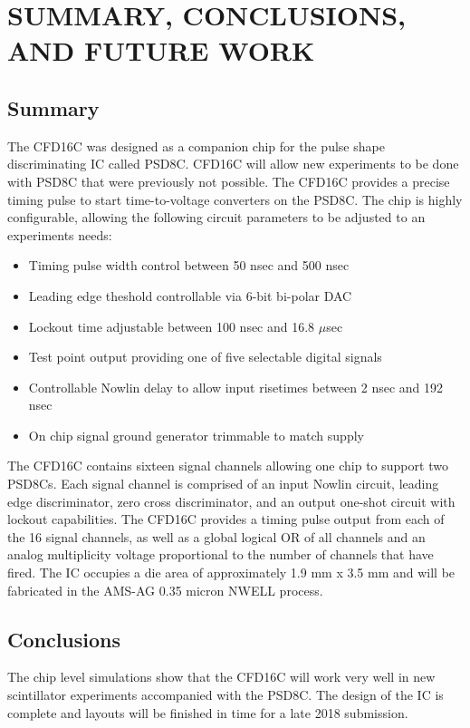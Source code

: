 \documentclass[12pt,oneside,final]{siuethesis}
\theoremstyle{definition}
\begin{document}


\chapter{SUMMARY, CONCLUSIONS, AND FUTURE WORK}

\section{Summary}
\par The CFD16C was designed as a companion chip for the pulse shape discriminating IC called PSD8C. CFD16C will allow new experiments to be done with PSD8C that were previously not possible. The CFD16C provides a precise timing pulse to start time-to-voltage converters on the PSD8C. The chip is highly configurable, allowing the following circuit parameters to be adjusted to an experiments needs:

\begin{itemize}
\item Timing pulse width control between 50 nsec and 500 nsec
\item Leading edge theshold controllable via 6-bit bi-polar DAC
\item Lockout time adjustable between 100 nsec and 16.8 $\mu$sec
\item Test point output providing one of five selectable digital signals
\item Controllable Nowlin delay to allow input risetimes between 2 nsec and 192 nsec
\item On chip signal ground generator trimmable to match supply
\end{itemize}

\par The CFD16C contains sixteen signal channels allowing one chip to support two PSD8Cs. Each signal channel is comprised of an input Nowlin circuit, leading edge discriminator, zero cross discriminator, and an output one-shot circuit with lockout capabilities. The CFD16C provides a timing pulse output from each of the 16 signal channels, as well as a global logical OR of all channels and an analog multiplicity voltage proportional to the number of channels that have fired. The IC occupies a die area of approximately 1.9 mm x 3.5 mm and will be fabricated in the AMS-AG 0.35 micron NWELL process.
\section{Conclusions}
\par The chip level simulations show that the CFD16C will work very well in new scintillator experiments accompanied with the PSD8C. The design of the IC is complete and layouts will be finished in time for a late 2018 submission.
\end{document}
